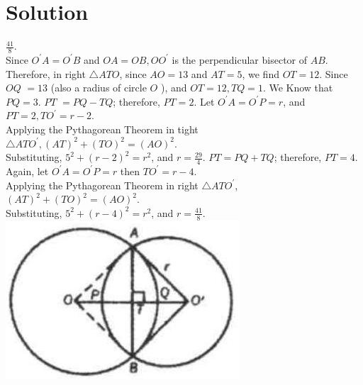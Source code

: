 \documentclass{article}
\begin{document}
\section*{Solution}
\(\frac{41}{8}\).\\
Since \(O^{\prime} A=O^{\prime} B\) and \(O A=O B, O O^{\prime}\) is the perpendicular bisector of \(A B\).\\
Therefore, in right \(\triangle A T O\), since \(A O=13\) and \(A T=5\), we find \(O T=12\). Since \(O Q\) \(=13\) (also a radius of circle \(O\) ), and \(O T=12, T Q=1\). We Know that \(P Q=3\). \(P T\) \(=P Q-T Q\); therefore, \(P T=2\). Let \(O^{\prime} A=O^{\prime} P=r\), and \(P T=2, T O^{\prime}=r-2\).\\
Applying the Pythagorean Theorem in tight \(\triangle A T O^{\prime},(A T)^{2}+(T O)^{2}=(A O)^{2}\).\\
Substituting, \(5^{2}+(r-2)^{2}=r^{2}\), and \(r=\frac{29}{4}\). \(P T=P Q+T Q\); therefore, \(P T=4\).\\
Again, let \(O^{\prime} A=O^{\prime} P=r\) then \(T O^{\prime}=r-4\).\\
Applying the Pythagorean Theorem in right \(\triangle A T O^{\prime}\),\\
\((A T)^{2}+(T O)^{2}=(A O)^{2}\).\\
Substituting, \(5^{2}+(r-4)^{2}=r^{2}\), and \(r=\frac{41}{8}\).\\
\centering
\includegraphics[width=\textwidth]{images/188(2).jpg}
\end{document}
